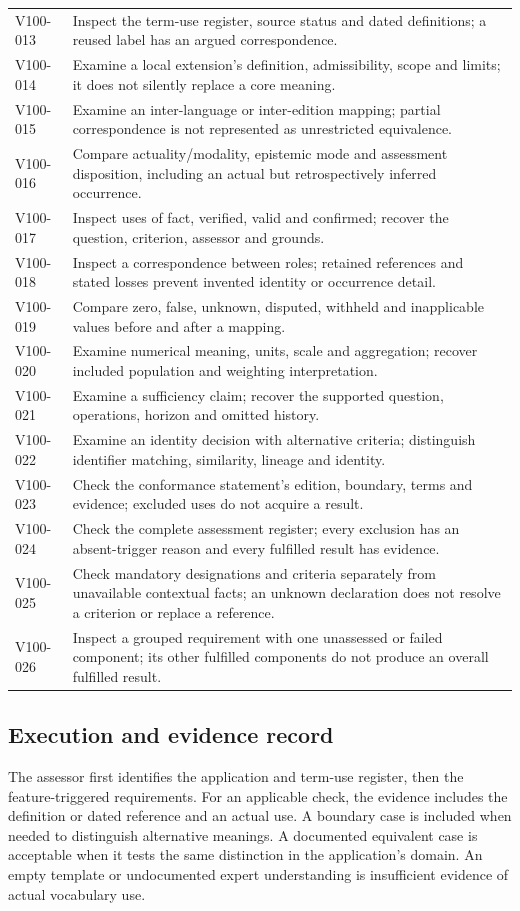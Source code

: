 \documentclass[11pt,a4paper]{article}
\begin{document}
\begin{longtable}{@{}L{0.17\textwidth}L{0.73\textwidth}@{}}
V100-013 & Inspect the term-use register, source status and dated definitions; a reused label has an argued correspondence. \\
V100-014 & Examine a local extension's definition, admissibility, scope and limits; it does not silently replace a core meaning. \\
V100-015 & Examine an inter-language or inter-edition mapping; partial correspondence is not represented as unrestricted equivalence. \\
V100-016 & Compare actuality/modality, epistemic mode and assessment disposition, including an actual but retrospectively inferred occurrence. \\
V100-017 & Inspect uses of fact, verified, valid and confirmed; recover the question, criterion, assessor and grounds. \\
V100-018 & Inspect a correspondence between roles; retained references and stated losses prevent invented identity or occurrence detail. \\
V100-019 & Compare zero, false, unknown, disputed, withheld and inapplicable values before and after a mapping. \\
V100-020 & Examine numerical meaning, units, scale and aggregation; recover included population and weighting interpretation. \\
V100-021 & Examine a sufficiency claim; recover the supported question, operations, horizon and omitted history. \\
V100-022 & Examine an identity decision with alternative criteria; distinguish identifier matching, similarity, lineage and identity. \\
V100-023 & Check the conformance statement's edition, boundary, terms and evidence; excluded uses do not acquire a result. \\
V100-024 & Check the complete assessment register; every exclusion has an absent-trigger reason and every fulfilled result has evidence. \\
V100-025 & Check mandatory designations and criteria separately from unavailable contextual facts; an unknown declaration does not resolve a criterion or replace a reference. \\
V100-026 & Inspect a grouped requirement with one unassessed or failed component; its other fulfilled components do not produce an overall fulfilled result. \\
\bottomrule
\end{longtable}

\subsection{Execution and evidence record}
The assessor first identifies the application and term-use register, then the feature-triggered requirements. For an applicable check, the evidence includes the definition or dated reference and an actual use. A boundary case is included when needed to distinguish alternative meanings. A documented equivalent case is acceptable when it tests the same distinction in the application's domain. An empty template or undocumented expert understanding is insufficient evidence of actual vocabulary use.
\end{document}
